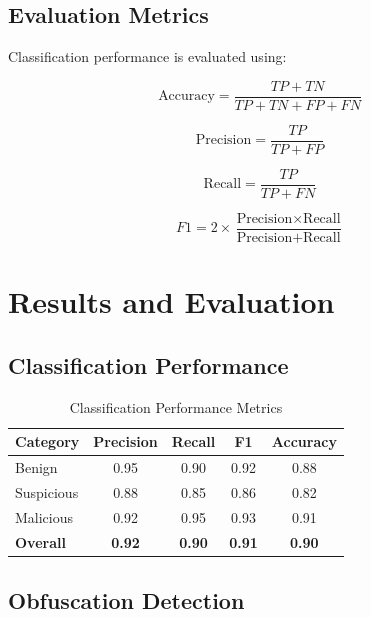 \documentclass[10pt,conference,a4paper]{IEEEtran}
\begin{document}
\subsection{Evaluation Metrics}

Classification performance is evaluated using:

\begin{equation}
\text{Accuracy} = \frac{TP + TN}{TP + TN + FP + FN}
\end{equation}

\begin{equation}
\text{Precision} = \frac{TP}{TP + FP}
\end{equation}

\begin{equation}
\text{Recall} = \frac{TP}{TP + FN}
\end{equation}

\begin{equation}
F1 = 2 \times \frac{\text{Precision} \times \text{Recall}}{\text{Precision} + \text{Recall}}
\end{equation}

\section{Results and Evaluation}

\subsection{Classification Performance}

\begin{table}[H]
\centering
\small
\begin{tabular}{|l|c|c|c|c|}
\hline
\textbf{Category} & \textbf{Precision} & \textbf{Recall} & \textbf{F1} & \textbf{Accuracy} \\
\hline
Benign & 0.95 & 0.90 & 0.92 & 0.88 \\
Suspicious & 0.88 & 0.85 & 0.86 & 0.82 \\
Malicious & 0.92 & 0.95 & 0.93 & 0.91 \\
\hline
\textbf{Overall} & \textbf{0.92} & \textbf{0.90} & \textbf{0.91} & \textbf{0.90} \\
\hline
\end{tabular}
\caption{Classification Performance Metrics}
\label{tab:performance}
\end{table}

\subsection{Obfuscation Detection}
\end{document}
